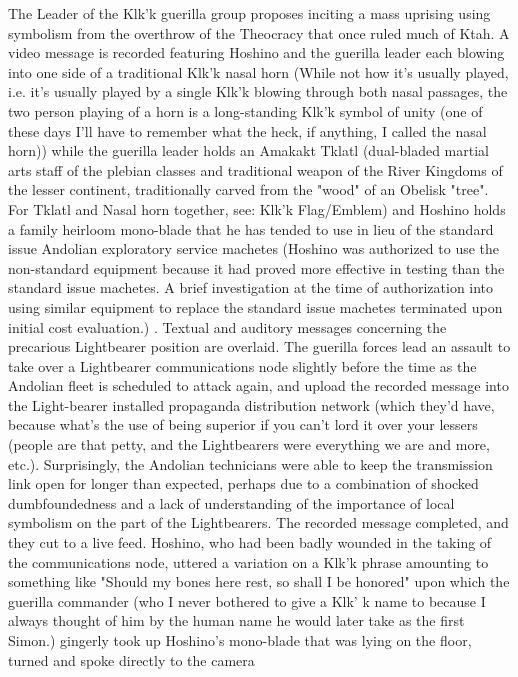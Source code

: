 \begin{itemize}
The Leader of the Klk'k guerilla group proposes inciting a mass
uprising using symbolism from the overthrow of the Theocracy that once
ruled much of Ktah. A video message is recorded featuring Hoshino and
the guerilla leader each blowing into one side of a traditional Klk'k
nasal horn (While not how it's usually played, i.e. it's usually
played by a single Klk'k blowing through both nasal passages, the two
person playing of a horn is a long-standing Klk'k symbol of unity
(one of these days I'll have to remember what the heck, if anything,
I called the nasal horn)) while the guerilla leader holds an Amakakt
Tklatl (dual-bladed martial arts staff of the plebian classes and
traditional weapon of the River Kingdoms of the lesser continent,
traditionally carved from the "wood" of an Obelisk "tree". For
Tklatl and Nasal horn together, see: Klk'k Flag/Emblem) and Hoshino
holds a family heirloom mono-blade that he has tended to use in lieu
of the standard issue Andolian exploratory service machetes (Hoshino
was authorized to use the non-standard equipment because it had proved
more effective in testing than the standard issue machetes. A brief
investigation at the time of authorization into using similar
equipment to replace the standard issue machetes terminated upon
initial cost evaluation.) . Textual and auditory messages concerning
the precarious Lightbearer position are overlaid. The guerilla forces
lead an assault to take over a Lightbearer communications node
slightly before the time as the Andolian fleet is scheduled to attack
again, and upload the recorded message into the Light-bearer installed
propaganda distribution network (which they'd have, because what's
the use of being superior if you can't lord it over your lessers
(people are that petty, and the Lightbearers were everything we are
and more, etc.). Surprisingly, the Andolian technicians were able to
keep the transmission link open for longer than expected, perhaps due
to a combination of shocked dumbfoundedness and a lack of
understanding of the importance of local symbolism on the part of the
Lightbearers. The recorded message completed, and they cut to a live
feed. Hoshino, who had been badly wounded in the taking of the
communications node, uttered a variation on a Klk'k phrase amounting
to something like "Should my bones here rest, so shall I be honored" 
upon which the guerilla commander (who I never bothered to give a Klk'
k name to because I always thought of him by the human name he would
later take as the first Simon.) gingerly took up Hoshino's mono-blade
that was lying on the floor, turned and spoke directly to the camera

\end{itemize}
